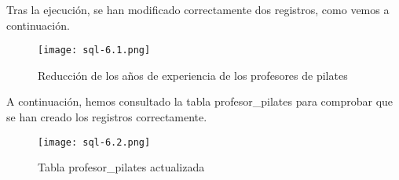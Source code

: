 \begin{enumerate}
    Tras la ejecución, se han modificado correctamente dos registros, como vemos a continuación.

        \begin{figure}[H]
        \centering
        \texttt{[image: sql-6.1.png]}
        \caption{Reducción de los años de experiencia de los profesores de pilates}
    \end{figure}

    A continuación, hemos consultado la tabla profesor\_pilates para comprobar que se han creado los registros correctamente.

    \begin{figure}[H]
        \centering
        \texttt{[image: sql-6.2.png]}
        \caption{Tabla profesor\_pilates actualizada}
    \end{figure}
\end{enumerate}


%
%

